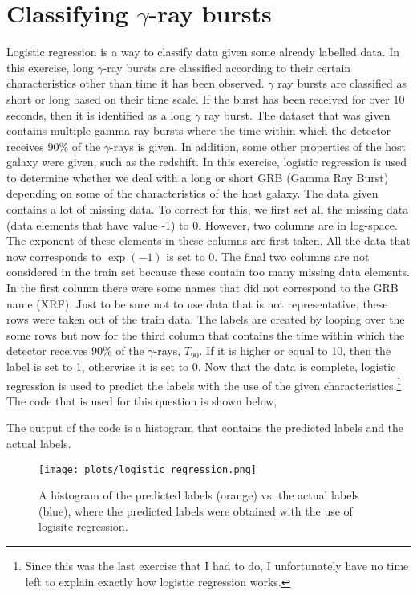 \section{Classifying $\gamma$-ray bursts}

Logistic regression is a way to classify data given some already labelled data. In this exercise, long $\gamma$-ray bursts are classified according to their certain characteristics other than time it has been observed. $\gamma$ ray bursts are classified as short or long based on their time scale. If the burst has been received for over 10 seconds, then it is identified as a long $\gamma$ ray burst. The dataset that was given contains multiple gamma ray bursts where the time within which the detector receives $90\%$ of the $\gamma$-rays is given. In addition, some other properties of the host galaxy were given, such as the redshift. In this exercise, logistic regression is used to determine whether we deal with a long or short GRB (Gamma Ray Burst) depending on some of the characteristics of the host galaxy. The data given contains a lot of missing data. To correct for this, we first set all the missing data (data elements that have value -1) to 0. However, two columns are in log-space. The exponent of these elements in these columns are first taken. All the data that now corresponds to $\exp(-1)$ is set to 0. The final two columns are not considered in the train set because these contain too many missing data elements. In the first column there were some names that did not correspond to the GRB name (XRF). Just to be sure not to use data that is not representative, these rows were taken out of the train data. The labels are created by looping over the some rows but now for the third column that contains the time within which the detector receives $90\%$ of the $\gamma$-rays, $T_{90}$. If it is higher or equal to 10, then the label is set to 1, otherwise it is set to 0. Now that the data is complete, logistic regression is used to predict the labels with the use of the given characteristics.\footnote{Since this was the last exercise that I had to do, I unfortunately have no time left to explain exactly how logistic regression works.} The code that is used for this question is shown below,


The output of the code is a histogram that contains the predicted labels and the actual labels. 

\begin{figure}[h]
\centering
\texttt{[image: plots/logistic\_regression.png]}
\caption{A histogram of the predicted labels (orange) vs. the actual labels (blue), where the predicted labels were obtained with the use of logisitc regression.}
\end{figure}


